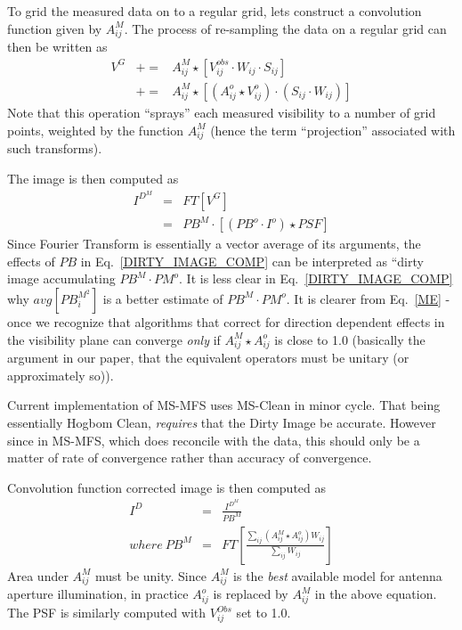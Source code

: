 \documentclass[11pt,epsf]{article}
\begin{document}
To grid the measured data on to a regular grid, lets construct a
convolution function given by $A^M_{ij}$.  The process of re-sampling
the data on a regular grid can then be written as
\begin{eqnarray}
\label{ME}
V^G &+=& A^M_{ij} \star \left[V^{obs}_{ij} \cdot W_{ij} \cdot S_{ij}\right]\\
&+=&A^M_{ij} \star \left[\left(A^o_{ij}\star V^o_{ij}\right) \cdot  \left(S_{ij}\cdot W_{ij}\right)\right]
\end{eqnarray}
Note that this operation ``sprays'' each measured visibility to a
number of grid points, weighted by the function $A^M_{ij}$ (hence the
term ``projection'' associated with such transforms).

The image is then computed as 
\begin{eqnarray}
I^{D^M} &=& FT \left[V^G\right]\\
\label{DIRTY_IMAGE_COMP}
        &=& PB^M \cdot \left[\left(PB^o\cdot I^o\right)\star PSF\right]
\end{eqnarray}
Since Fourier Transform is essentially a vector average of its
arguments, the effects of $PB$ in Eq.~\ref{DIRTY_IMAGE_COMP} can be
interpreted as ``dirty image accumulating $PB^M\cdot PM^o$.  It is
less clear in Eq.~\ref{DIRTY_IMAGE_COMP} why
$avg\left[PB_i^{M^2}\right]$ is a better estimate of $PB^M \cdot
PM^o$.  It is clearer from Eq.~\ref{ME} - once we recognize that
algorithms that correct for direction dependent effects in the
visibility plane can converge {\it only} if $A^M_{ij} \star A^o_{ij}$
is close to 1.0 (basically the argument in our paper, that the
equivalent operators must be unitary (or approximately so)).

Current implementation of MS-MFS uses MS-Clean in minor cycle.  That
being essentially Hogbom Clean, {\it requires} that the Dirty Image be
accurate.  However since in MS-MFS, which does reconcile with the
data, this should only be a matter of rate of convergence rather than
accuracy of convergence.

Convolution function corrected image is then computed as
\begin{eqnarray}
\label{DIRTY_IMAGE}
I^{D} &=& \frac{I^{D^M}}{PB^M}\\
where~ PB^M &=& FT\left[\frac{\sum_{ij} \left( A^M_{ij} \star A^o_{ij} \right) W_{ij}}{\sum_{ij} W_{ij}}\right]
\end{eqnarray}
Area under $A^M_{ij}$ must be unity.  Since $A^M_{ij}$ is the {\it
best} available model for antenna aperture illumination, in practice
$A^o_{ij}$ is replaced by $A^M_{ij}$ in the above equation.  The PSF
is similarly computed with $V^{Obs}_{ij}$ set to 1.0.
\end{document}
